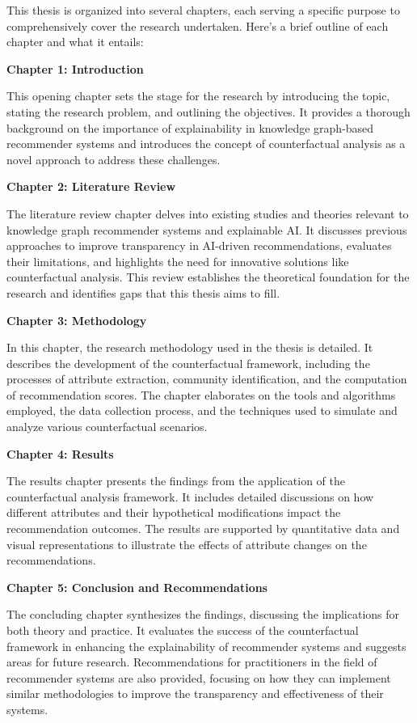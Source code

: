 This thesis is organized into several chapters, each serving a specific purpose
to comprehensively cover the research undertaken. Here's a brief outline of each
chapter and what it entails:

\textbf{Chapter 1: Introduction}

This opening chapter sets the stage for the research by introducing the topic,
stating the research problem, and outlining the objectives. It provides a
thorough background on the importance of explainability in knowledge graph-based
recommender systems and introduces the concept of counterfactual analysis as a
novel approach to address these challenges.

\textbf{Chapter 2: Literature Review}

The literature review chapter delves into existing studies and theories relevant
to knowledge graph recommender systems and explainable AI. It discusses previous
approaches to improve transparency in AI-driven recommendations, evaluates their
limitations, and highlights the need for innovative solutions like counterfactual
analysis. This review establishes the theoretical foundation for the research
and identifies gaps that this thesis aims to fill.

\textbf{Chapter 3: Methodology}

In this chapter, the research methodology used in the thesis is detailed. It
describes the development of the counterfactual framework, including the processes
of attribute extraction, community identification, and the computation of recommendation
scores. The chapter elaborates on the tools and algorithms employed, the data collection
process, and the techniques used to simulate and analyze various counterfactual
scenarios.

\textbf{Chapter 4: Results}

The results chapter presents the findings from the application of the
counterfactual analysis framework. It includes detailed discussions on how different
attributes and their hypothetical modifications impact the recommendation outcomes.
The results are supported by quantitative data and visual representations to
illustrate the effects of attribute changes on the recommendations.

\textbf{Chapter 5: Conclusion and Recommendations}

The concluding chapter synthesizes the findings, discussing the implications for
both theory and practice. It evaluates the success of the counterfactual
framework in enhancing the explainability of recommender systems and suggests
areas for future research. Recommendations for practitioners in the field of recommender
systems are also provided, focusing on how they can implement similar
methodologies to improve the transparency and effectiveness of their systems.